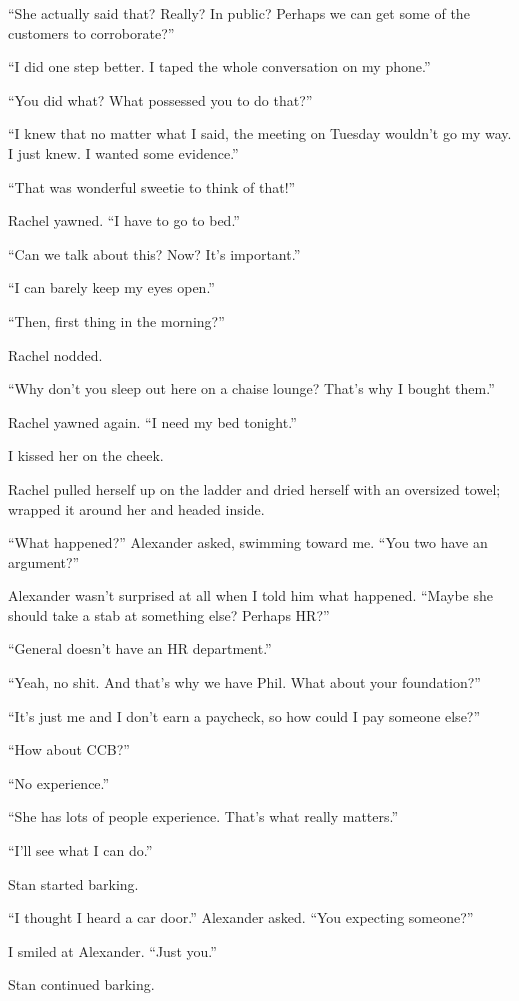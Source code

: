 ``She actually said that? Really? In public? Perhaps we can get some of
the customers to corroborate?''

``I did one step better. I taped the whole conversation on my phone.''

``You did what? What possessed you to do that?''

``I knew that no matter what I said, the meeting on Tuesday wouldn't go
my way. I just knew. I wanted some evidence.''

``That was wonderful sweetie to think of that!''

Rachel yawned. ``I have to go to bed.''

``Can we talk about this? Now? It's important.''

``I can barely keep my eyes open.''

``Then, first thing in the morning?''

Rachel nodded.

``Why don't you sleep out here on a chaise lounge? That's why I bought
them.''

Rachel yawned again. ``I need my bed tonight.''

I kissed her on the cheek.

Rachel pulled herself up on the ladder and dried herself with an
oversized towel; wrapped it around her and headed inside.

``What happened?'' Alexander asked, swimming toward me. ``You two have
an argument?''

Alexander wasn't surprised at all when I told him what happened. ``Maybe
she should take a stab at something else? Perhaps HR?''

``General doesn't have an HR department.''

``Yeah, no shit. And that's why we have Phil. What about your
foundation?''

``It's just me and I don't earn a paycheck, so how could I pay someone
else?''

``How about CCB?''

``No experience.''

``She has lots of people experience. That's what really matters.''

``I'll see what I can do.''

Stan started barking.

``I thought I heard a car door.'' Alexander asked. ``You expecting
someone?''

I smiled at Alexander. ``Just you.''

Stan continued barking.

